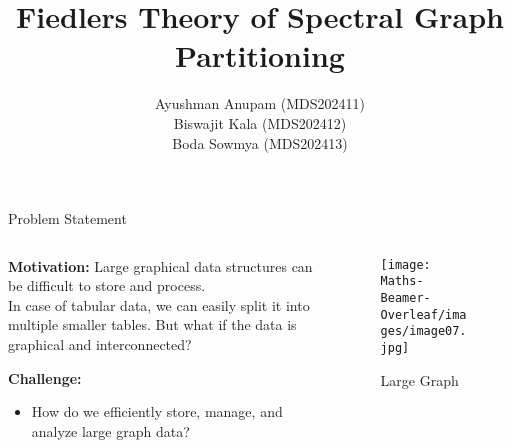 \documentclass[aspectratio=169]{beamer}
\title[Fiedlers Theory of Spectral Graph Partitioning] %
{Fiedlers Theory of Spectral Graph Partitioning} %
\author{Ayushman Anupam (MDS202411) \\ Biswajit Kala (MDS202412) \\ Boda Sowmya (MDS202413)}
\institute{Data Science\\Chennai Mathematical Institute}
\date[18 May 2024]  %
\begin{document}
\begin{frame}[plain]
  \titlepage
\end{frame}
\begin{frame}{Problem Statement}

\begin{columns}

    \begin{column}{0.6\textwidth}
        \textbf{Motivation:} Large graphical data structures can be difficult to store and process. \\
        In case of tabular data, we can easily split it into multiple smaller tables. But what if the data is graphical and interconnected? 

        \vspace{0.3cm}
        \textbf{Challenge:}  
        \begin{itemize}
            \item How do we efficiently store, manage, and analyze large graph data?
        \end{itemize}
    \end{column}

    \begin{column}{0.4\textwidth}
        \begin{figure}
            \centering
            \texttt{[image: Maths-Beamer-Overleaf/images/image07.jpg]}
            \caption*{\small Large Graph}
        \end{figure}
    \end{column}

\end{columns}

\end{frame}
\end{document}
